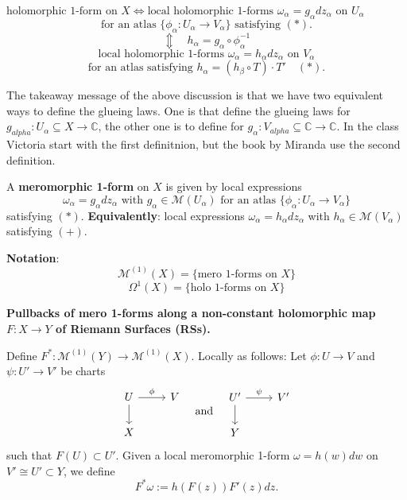 \documentclass{article}
\begin{document}
$\text{holomorphic 1-form on } X \iff \text{local holomorphic 1-forms } \omega_\alpha = g_\alpha dz_\alpha \text{ on } U_\alpha$
$$\text{for an atlas } \{ \phi_\alpha: U_\alpha \to V_\alpha \} \text{ satisfying } (\ast).$$
$$\Updownarrow \quad h_\alpha = g_\alpha \circ \phi_\alpha^{-1}$$
$$\text{local holomorphic 1-forms } \omega_\alpha = h_\alpha dz_\alpha \text{ on } V_\alpha$$
$$\text{for an atlas satisfying } h_\alpha = (h_\beta \circ T) \cdot T' \quad (\ast).$$
\begin{remark}
    The takeaway message of the above discussion is that we have two equivalent ways to define the glueing laws. One is that define the glueing laws for $g_{alpha}:U_{\alpha}\subseteq X \to \mathbb{C}$, the other one is to define for $g_{\alpha}:V_{alpha}\subseteq \mathbb{C} \to \mathbb{C}$. In the class Victoria start with the first definitnion, but the book by Miranda use the second definition.
\end{remark}

\begin{definition}
A \textbf{meromorphic 1-form} on $X$ is given by local expressions
$$\omega_\alpha = g_\alpha dz_\alpha \text{ with } g_\alpha \in \mathcal{M}(U_\alpha) \text{ for an atlas } \{ \phi_\alpha: U_\alpha \to V_\alpha \}$$
satisfying $(\ast)$.
\textbf{Equivalently}: local expressions $\omega_\alpha = h_\alpha dz_\alpha$
with $h_\alpha \in \mathcal{M}(V_\alpha)$ satisfying $(+)$.
\end{definition}

\textbf{Notation}:
$$\mathcal{M}^{(1)}(X) = \{ \text{mero 1-forms on } X \}$$
$$\Omega^1(X) = \{ \text{holo 1-forms on } X \}$$

\textbf{Pullbacks of mero 1-forms along a non-constant holomorphic map $F: X \to Y$ of Riemann Surfaces (RSs).}

Define $F^*: \mathcal{M}^{(1)}(Y) \to \mathcal{M}^{(1)}(X)$. Locally as follows:
Let $\phi: U \to V$ and $\psi: U' \to V'$ be charts
$$\begin{tikzcd}
U \arrow{r}{\phi} \arrow{d} & V \\
X &
\end{tikzcd}
\quad \text{and} \quad
\begin{tikzcd}
U' \arrow{r}{\psi} \arrow{d} & V' \\
Y &
\end{tikzcd}$$
such that $F(U) \subset U'$. Given a local meromorphic 1-form $\omega = h(w) dw$ on $V' \cong U' \subset Y$, we define
$$F^* \omega := h(F(z)) F'(z) dz.$$
\end{document}
